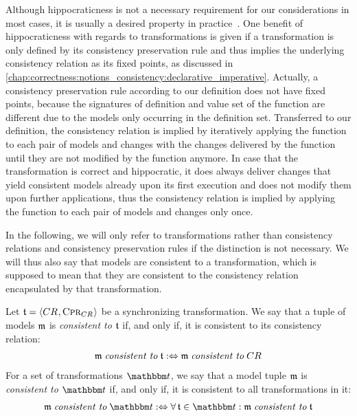 Although hippocraticness is not a necessary requirement for our considerations in most cases, it is usually a desired property in practice~\cite{stevens2010sosym}.
One benefit of hippocraticness with regards to transformations is given if a transformation is only defined by its consistency preservation rule and thus implies the underlying consistency relation as its fixed points, as discussed in \autoref{chap:correctness:notions_consistency:declarative_imperative}.
Actually, a consistency preservation rule according to our definition does not have fixed points, because the signatures of definition and value set of the function are different due to the models only occurring in the definition set.
Transferred to our definition, the consistency relation is implied by iteratively applying the function to each pair of models and changes with the changes delivered by the function until they are not modified by the function anymore.
In case that the transformation is correct and hippocratic, it does always deliver changes that yield consistent models already upon its first execution and does not modify them upon further applications, thus the consistency relation is implied by applying the function to each pair of models and changes only once.

In the following, we will only refer to transformations rather than consistency relations and consistency preservation rules if the distinction is not necessary.
We will thus also say that models are consistent to a transformation, which is supposed to mean that they are consistent to the consistency relation encapsulated by that transformation.

\begin{definition}
    \label{def:consistencytransformation}
    Let $\transformation{t} = \tupled{\consistencyrelation{CR}{}, \consistencypreservationrule{\consistencyrelation{CR}{}}}$ be a synchronizing transformation.
    We say that a tuple of models $\modeltuple{m}$ is \emph{consistent to} $\transformation{t}$ if, and only if, it is consistent to its consistency relation:
    \begin{align*}
        \modeltuple{m} \consistenttomath \transformation{t} \equivalentperdefinition \modeltuple{m} \consistenttomath \consistencyrelation{CR}{}
    \end{align*}
    For a set of transformations $\transformationset{T}$, we say that a model tuple $\modeltuple{m}$ is \emph{consistent to} $\transformationset{T}$ if, and only if, it is consistent to all transformations in it:
    \begin{align*}
        \modeltuple{m} \consistenttomath \transformationset{T} \equivalentperdefinition \forall \transformation{t} \in \transformationset{T} : \modeltuple{m} \consistenttomath \transformation{t}
    \end{align*}
\end{definition}

